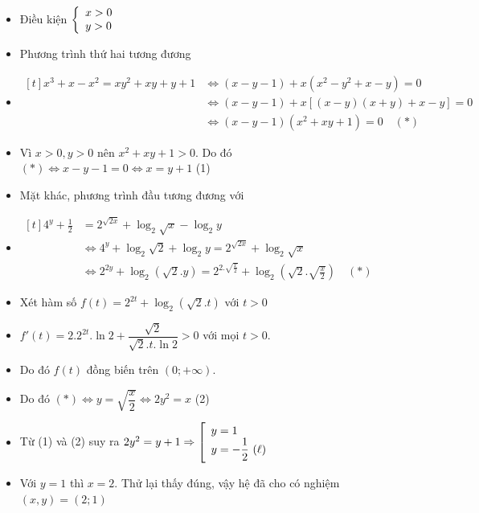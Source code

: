 \lgi 
\begin{itemize}[label=,leftmargin=*]
\item Điều kiện $\left\{\begin{array}{ll}x> 0 \\ y>0\end{array}\right.$
\item Phương trình thứ hai tương đương
\item $\begin{aligned}[t]x^3+x-x^2=xy^2+xy+y+1& \Leftrightarrow (x-y-1)+x(x^2-y^2+x-y)=0 \\
&\Leftrightarrow (x-y-1)+x[(x-y)(x+y)+x-y]=0 \\
&\Leftrightarrow (x-y-1)(x^2+xy+1)=0 \quad (*) \end{aligned}$ 
\item Vì $x>0,y>0$ nên $x^2+xy+1>0$. Do đó $(*)\Leftrightarrow x-y-1=0 \Leftrightarrow x=y+1$ (1)
\item Mặt khác, phương trình đầu tương đương với
\item $\begin{aligned}[t]4^y+\frac{1}{2}&=2^{\sqrt{2x}}+\log_2 \sqrt{x}-\log_2 y \\
&\Leftrightarrow 4^y+\log_2\sqrt{2}+\log_2y=2^{\sqrt{2x}}+\log_2\sqrt{x} \\
&\Leftrightarrow 2^{2y}+\log_2(\sqrt{2}.y)=2^{2.\sqrt{\frac{x}{2}}}+\log_2\left(\sqrt{2}.{\sqrt{\frac{x}{2}}}\right) \quad (*)\end{aligned}$
\item Xét hàm số $f(t)=2^{2t}+\log_2(\sqrt{2}.t)$ với $t>0$
\item $f'(t)=2.2^{2t}.\ln 2+\dfrac{\sqrt{2}}{\sqrt{2}.t.\ln 2}>0$ với mọi $t>0$. 
\item Do đó $f(t)$ đồng biến trên $(0;+\infty)$.
\item Do đó $(*)\Leftrightarrow y=\sqrt{\dfrac{x}{2}}\Leftrightarrow 2y^2=x$ (2)
\item Từ (1) và (2) suy ra $2y^2=y+1\Rightarrow \hay{y=1 \\ y=-\dfrac{1}{2} \ (\ell)}$
\item Với $y=1$ thì $x=2$. Thử lại thấy đúng, vậy hệ đã cho có nghiệm $(x,y)=(2;1)$
\end{itemize}

